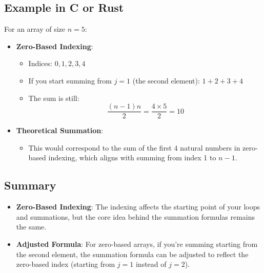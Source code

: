 \documentclass{article}
\begin{document}
\subsection*{Example in C or Rust}

For an array of size \(n = 5\):

\begin{itemize}
    \item \textbf{Zero-Based Indexing}:
    \begin{itemize}
        \item Indices: \(0, 1, 2, 3, 4\)
        \item If you start summing from \(j = 1\) (the second element): \(1 + 2 + 3 + 4\)
        \item The sum is still:
        \[
        \frac{(n-1)n}{2} = \frac{4 \times 5}{2} = 10
        \]
    \end{itemize}
    \item \textbf{Theoretical Summation}:
    \begin{itemize}
        \item This would correspond to the sum of the first \(4\) natural numbers in zero-based indexing, which aligns with summing from index 1 to \(n-1\).
    \end{itemize}
\end{itemize}

\subsection*{Summary}

\begin{itemize}
    \item \textbf{Zero-Based Indexing}: The indexing affects the starting point of your loops and summations, but the core idea behind the summation formulas remains the same.
    \item \textbf{Adjusted Formula}: For zero-based arrays, if you’re summing starting from the second element, the summation formula can be adjusted to reflect the zero-based index (starting from \(j = 1\) instead of \(j = 2\)).
\end{itemize}
\end{document}
